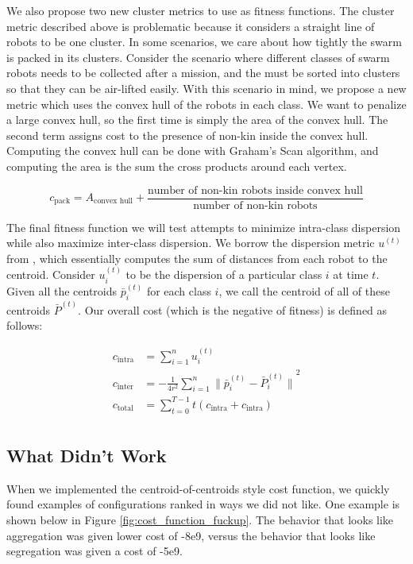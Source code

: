 \documentclass[conference]{IEEEtran}
\begin{document}
  We also propose two new cluster metrics to use as fitness functions. The cluster metric described above is problematic because it considers a straight line of robots to be one cluster. In some scenarios, we care about how tightly the swarm is packed in its clusters. Consider the scenario where different classes of swarm robots needs to be collected after a mission, and the must be sorted into clusters so that they can be air-lifted easily. With this scenario in mind, we propose a new metric which uses the convex hull of the robots in each class. We want to penalize a large convex hull, so the first time is simply the area of the convex hull. The second term assigns cost to the presence of non-kin inside the convex hull. Computing the convex hull can be done with Graham's Scan algorithm, and computing the area is the sum the cross products around each vertex.

  $$ c_{\text{pack}} = A_\text{convex hull} + \frac{\text{number of non-kin robots inside convex hull}}{\text{number of non-kin robots}}$$

  The final fitness function we will test attempts to minimize intra-class dispersion while also maximize inter-class dispersion. We borrow the dispersion metric $u^{(t)}$ from \cite{gauci_self-organized_2014}, which essentially computes the sum of distances from each robot to the centroid. Consider $u_i^{(t)}$ to be the dispersion of a particular class $i$ at time $t$. Given all the centroids $\bar{p}_i^{(t)}$ for each class $i$, we call the centroid of all of these centroids $\bar{P}^{(t)}$. Our overall cost (which is the negative of fitness) is defined as follows:

  \begin{align*}
  c_{\text{intra}} &= \sum_{i=1}^n u_i^{(t)} \\
  c_{\text{inter}} &= -\frac{1} {4r^2}\sum_{i=1}^n{\lVert \bar{p}_i^{(t)} - \bar{P}_i^{(t)} \rVert}^2 \\
  c_{\text{total}} &=  \sum_{t=0}^{T-1} t (c_{\text{intra}} + c_{\text{intra}}) \\
  \end{align*}


  \subsection{What Didn't Work}

  When we implemented the centroid-of-centroids style cost function, we quickly found examples of configurations ranked in ways we did not like. One example is shown below in Figure \ref{fig:cost_function_fuckup}. The behavior that looks like aggregation was given lower cost of -8e9, versus the behavior that looks like segregation was given a cost of -5e9.
\end{document}
